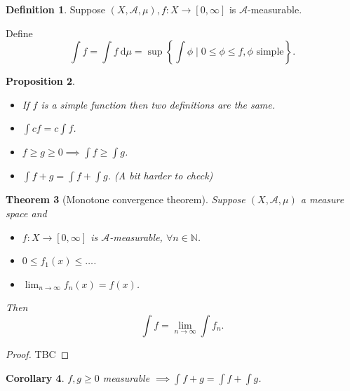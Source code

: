 \documentclass{report}
\newcommand{\N}{\mathbb{N}}
\newcommand{\cA}{\mathcal{A}}
\newcommand{\df}{\ \mathrm{d}}
\newtheorem{theorem}{Theorem}[chapter]
\newtheorem{corollary}[theorem]{Corollary}
\newtheorem{proposition}[theorem]{Proposition}
\theoremstyle{definition}
\newtheorem{definition}[theorem]{Definition}
\theoremstyle{remark}
\newcommand{\fnl}{\parbox[t]{0\linewidth}{}}
\begin{document}
\begin{definition}
	Suppose $(X, \cA, \mu), f: X \to [0, \infty]$ is $\cA$-measurable. 

	Define \[
		\int f = \int f \df\mu = \sup\left\lbrace \int \phi \mid 0 \leq \phi \leq f, \phi \text{ simple} \right\rbrace.	
	\]
\end{definition}
\begin{proposition}\fnl
	\begin{itemize}
		\item If $f$ is a simple function then two definitions are the same.
		\item $\displaystyle \int cf = c\int f$.
		\item $\displaystyle f \geq g \geq 0 \implies \int f \geq \int g$.
		\item $\displaystyle \int f + g = \int f + \int g$. (A bit harder to check)
	\end{itemize}
\end{proposition}
\begin{theorem}[Monotone convergence theorem]
	Suppose $(X, \cA, \mu)$ a measure space and \begin{itemize}
		\item $f: X \to [0, \infty]$ is $\cA$-measurable, $\forall n \in \N$.
		\item $0 \leq f_1(x) \leq \ldots $.
		\item $\displaystyle \lim_{n \to \infty} f_n(x) = f(x)$.
	\end{itemize}
	Then
	\[
		\int f = \lim_{n \to \infty} \int f_n.	
	\]
\end{theorem}
\begin{proof}
	TBC
\end{proof}
\begin{corollary}
	$f, g \geq 0$ measurable $\displaystyle \implies \int f + g = \int f + \int g$. 
\end{corollary}
\end{document}
